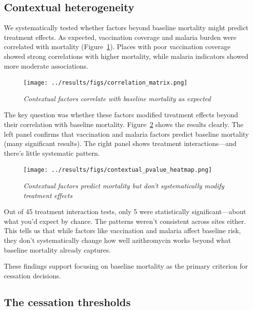 \documentclass[11pt]{article}\usepackage[]{graphicx}\usepackage[]{xcolor}
\begin{document}
\linespread{1.5}

\subsection{Contextual heterogeneity}

We systematically tested whether factors beyond baseline mortality might predict treatment effects. As expected, vaccination coverage and malaria burden were correlated with mortality (Figure~\ref{fig:correlation-matrix}). Places with poor vaccination coverage showed strong correlations with higher mortality, while malaria indicators showed more moderate associations.

\begin{figure}[!h]
\centering
\texttt{[image: ../results/figs/correlation\_matrix.png]}
\caption{\emph{Contextual factors correlate with baseline mortality as expected}}
\label{fig:correlation-matrix}
\end{figure}

The key question was whether these factors modified treatment effects beyond their correlation with baseline mortality. Figure~\ref{fig:contextual-analysis} shows the results clearly. The left panel confirms that vaccination and malaria factors predict baseline mortality (many significant results). The right panel shows treatment interactions---and there's little systematic pattern.

\begin{figure}[!h]
\centering
\texttt{[image: ../results/figs/contextual\_pvalue\_heatmap.png]}
\caption{\emph{Contextual factors predict mortality but don't systematically modify treatment effects}}
\label{fig:contextual-analysis}
\end{figure}

Out of 45 treatment interaction tests, only 5 were statistically significant---about what you'd expect by chance. The patterns weren't consistent across sites either. This tells us that while factors like vaccination and malaria affect baseline risk, they don't systematically change how well azithromycin works beyond what baseline mortality already captures.

These findings support focusing on baseline mortality as the primary criterion for cessation decisions.

\newpage
\subsection{The cessation thresholds}
\end{document}
